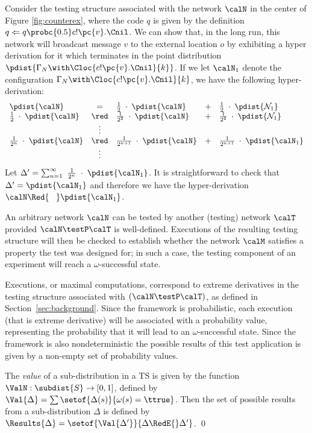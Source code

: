 \documentclass{LMCS}
\begin{document}
\begin{exa}
\label{ex:hypder}
Consider the testing structure associated with the network $\calN$ in
the center of Figure \ref{fig:counterex}, where the code $q$ is given
by the definition $q \Leftarrow q \probc{0.5} c!\pc{v}.\Cnil$. We can
show that, in the long run, this network will broadcast message $v$ to
the external location $o$ by exhibiting a hyper derivation for it
which terminates in the point distribution $\pdist{\Gamma_N \with
  \Cloc{c!\pc{v}.\Cnil}{k}}$.  If we let $\calN_1$ denote the configuration $ \Gamma_N \with
\Cloc{c!\pc{v}.\Cnil}{k}$,  we have the following 
hyper-derivation:
$$
\begin{array}{lclcl}
  \pdist{\calN} &=& \frac{1}{2} \;\cdot\; \pdist{\calN} &+ &
  \frac{1}{2} \;\cdot\;\pdist{\mathcal{N}_1}\\
  \frac{1}{2} \;\cdot\;\pdist{\calN}  &\red& \frac{1}{2^2}\;\cdot\; \pdist{\calN} &+ &
  \frac{1}{2^2}\;\cdot\; \pdist{\mathcal{N}_1} \\
&\vdots& \\
  \frac{1}{2^n}\;\cdot\; \pdist{\calN}  &\red& \frac{1}{2^{n+1}}\;\cdot\; \pdist{\calN} &+ &
  \frac{1}{2^{n+1}}\;\cdot\; \pdist{\calN_1} \\
&\vdots    &   \\
\end{array}
$$
\noindent
Let $\Delta' = \sum_{n=1}^\infty \ \frac{1}{2^{n}}\;\cdot\; \pdist{\calN_1}$. 
It is straightforward to check  that
\begin{math}
\Delta' =
\pdist{\calN_1}
\end{math}
and therefore we have the hyper-derivation $\calN \Red{\;\;\;} \pdist{\calN_1} $. 
\end{exa}

An arbitrary network $\calN$ can be tested by another (testing) network $\calT$ provided 
$\calN \testP \calT$ is well-defined.
Executions of the resulting testing structure will then be checked to establish whether 
the network $\calM$ satisfies a property the test was designed for; in such a case, the testing component 
of an experiment will reach a $\omega$-successful state. 

Executions, or maximal computations, correspond to
extreme derivatives in the testing structure associated with $(\calN \testP \calT)$, 
as defined in Section~\ref{sec:background}. 
Since the framework is probabilistic, each execution (that is  extreme derivative)  will be associated with 
a probability value, representing the probability that it will lead to an $\omega$-successful state.
Since the framework is also nondeterministic the possible results of this test application is given by a
non-empty set of probability values. 
\begin{defi}\label{def:resultsets}
 The \emph{value} of a sub-distribution in a TS is given by the function   
$\ValN : \subdist{S} \rightarrow [0,1]$,  defined by
    $\Val{\Delta} = \sum\setof{ \Delta(s)}{ \omega(s) = \ttrue}$.
Then the set of possible results from a sub-distribution $\Delta$  is defined by  
$\Results{\Delta} = \setof{\Val{\Delta'}}{ \Delta \RedE{} \Delta'}$. 
\qed
\end{defi}
\end{document}
